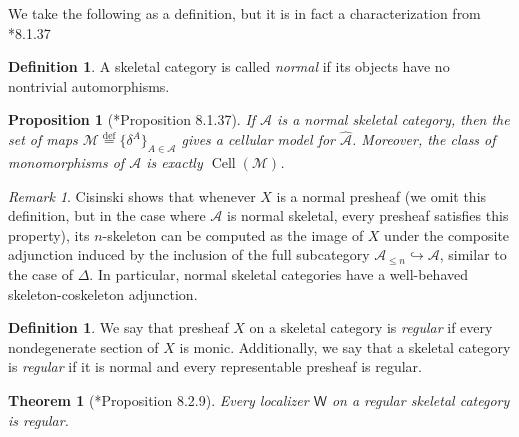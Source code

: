 \documentclass[a4paper]{article}
\numberwithin{equation}{subsection}
\theoremstyle{plain}   %
\newtheorem{thm}[equation]{Theorem}
\newtheorem{prop}[equation]{Proposition}
\theoremstyle{definition}
\newtheorem{defn}[equation]{Definition}
\theoremstyle{remark}
\newtheorem{rem}[equation]{Remark}
\theoremstyle{plain}
\newcommand{\psh}[1]{\ensuremath{\widehat{#1}}}
\newcommand{\defeq}{\overset{\mathrm{def}}=}
\begin{document}
We take the following as a definition, but it is in fact a characterization from \cite{cisinski-book}*{8.1.37}
\begin{defn}
	A skeletal category is called \emph{normal} if its objects have no nontrivial automorphisms.
\end{defn}
\begin{prop}[\cite{cisinski-book}*{Proposition 8.1.37}]\label{normskelcat}
	If \(\mathcal{A}\) is a normal skeletal category, then the set of maps \(\mathscr{M}\defeq \{\delta^A\}_{A\in \mathcal{A}}\) gives a cellular model for \(\psh{\mathcal{A}}\). Moreover, the class of monomorphisms of \(\mathcal{A}\) is exactly \(\operatorname{Cell}(\mathscr{M})\).
\end{prop}
\begin{rem}
	Cisinski shows that whenever \(X\) is a normal presheaf (we omit this definition, but in the case where \(\mathcal{A}\) is normal skeletal, every presheaf satisfies this property), its \(n\)-skeleton can be computed as the image of \(X\) under the composite  adjunction induced by the inclusion of the full subcategory \(\mathcal{A}_{\leq n}\hookrightarrow \mathcal{A}\), similar to the case of \(\Delta\).  In particular, normal skeletal categories have a well-behaved skeleton-coskeleton adjunction.  
\end{rem}
\begin{defn}\label{regskelcat}
	We say that presheaf \(X\) on a skeletal category is \emph{regular} if every nondegenerate section of \(X\) is monic. Additionally, we say that a skeletal category is \emph{regular} if it is normal and every representable presheaf is regular.
\end{defn}
\begin{thm}[\cite{cisinski-book}*{Proposition 8.2.9}]
	Every localizer \(\mathsf{W}\) on a regular skeletal category is regular.
\end{thm}
\end{document}
